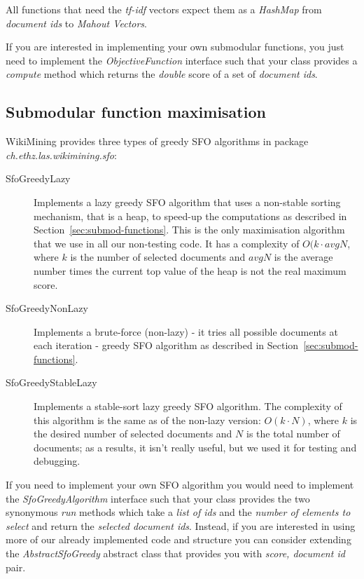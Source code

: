 All functions that need the \emph{tf-idf} vectors expect them as a
\emph{HashMap} from \emph{document ids} to \emph{Mahout Vectors}.

If you are interested in implementing your own submodular functions, you just
need to implement the \emph{ObjectiveFunction} interface such that your class
provides a \emph{compute} method which returns the \emph{double} score of a set
of \emph{document ids}.

\subsection{Submodular function maximisation}

WikiMining provides three types of greedy \acf{SFO} algorithms in package
\emph{ch.ethz.las.wikimining.sfo}:
\begin{description}
  \item[SfoGreedyLazy] Implements a lazy greedy \ac{SFO} algorithm that uses a
  non-stable sorting mechanism, that is a heap, to speed-up the computations as
  described in Section~\vref{sec:submod-functions}. This is the only
  maximisation algorithm that we use in all our non-testing code. It has a
  complexity of \(O(k \cdot avgN\), where \(k\) is the number of selected
  documents and \(avgN\) is the average number times the current top value of
  the heap is not the real maximum score.
  \item[SfoGreedyNonLazy] Implements a brute-force (non-lazy) - it tries all
  possible documents at each iteration - greedy \ac{SFO} algorithm as described
  in Section~\vref{sec:submod-functions}.
  \item[SfoGreedyStableLazy] Implements a stable-sort lazy greedy \ac{SFO}
  algorithm. The complexity of this algorithm is the same as of the non-lazy
  version: \(O(k \cdot N)\), where \(k\) is the desired number of selected
  documents and \(N\) is the total number of documents; as a results, it isn't
  really useful, but we used it for testing and debugging.
\end{description}

If you need to implement your own \acl{SFO} algorithm you would need to
implement the \emph{SfoGreedyAlgorithm} interface such that your class provides
the two synonymous \emph{run} methods which take a \emph{list of ids} and the
\emph{number of elements to select} and return the \emph{selected document
ids}. Instead, if you are interested in using more of our already implemented
code and structure you can consider extending the \emph{AbstractSfoGreedy}
abstract class that provides you with \emph{score, document id} pair.

